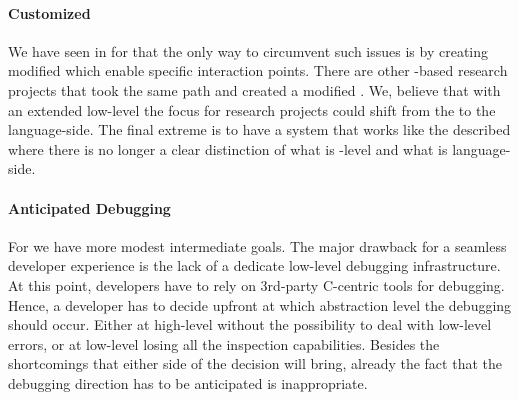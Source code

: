 \paragraph{Customized \VM \MOP}
We have seen in  for \NBJ that the only way to circumvent such issues is by creating modified \VMs which enable specific interaction points.
There are other \PH-based research projects \cite{Arna13a,Lien08b} that took the same path and created a modified \VM.
We, believe that with an extended low-level \MOP the focus for research projects could shift from the \VM to the language-side.
The final extreme is to have a system that works like the described \Klein \VM where there is no longer a clear distinction of what is \VM-level and what is language-side.

\paragraph{Anticipated Debugging}
For \B we have more modest intermediate goals.
The major drawback for a seamless developer experience is the lack of a dedicate low-level debugging infrastructure.
At this point, \B developers have to rely on 3rd-party C-centric tools for debugging.
Hence, a developer has to decide upfront at which abstraction level the debugging should occur.
Either at high-level without the possibility to deal with low-level errors, or at low-level losing all the inspection capabilities.
Besides the shortcomings that either side of the decision will bring, already the fact that the debugging direction has to be anticipated is inappropriate.

